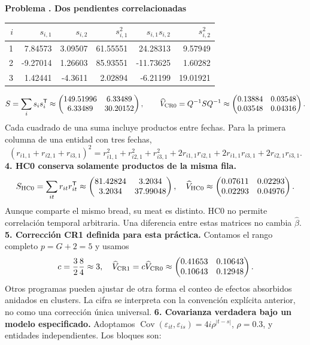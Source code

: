 \documentclass[11pt,a4paper]{article}
\newcommand{\T}{^{\mathsf T}}
\DeclareMathOperator{\Cov}{Cov}
\theoremstyle{definition}
\newcounter{problema}
\newenvironment{resuelto}[1]{\refstepcounter{problema}\par\medskip\Needspace{6\baselineskip}\textbf{Problema \theproblema. #1}\par}{\par\medskip}
\newcommand{\eps}{\varepsilon}
\begin{document}
\begin{resuelto}{Dos pendientes correlacionadas}
\begin{center}\small
\begin{tabular}{rrrrrr}
\toprule
$i$&$s_{i,1}$&$s_{i,2}$&$s_{i,1}^2$&$s_{i,1}s_{i,2}$&$s_{i,2}^2$\\
\midrule
1&7.84573&3.09507&61.55551&24.28313&9.57949\\
2&-9.27014&1.26603&85.93551&-11.73625&1.60282\\
3&1.42441&-4.3611&2.02894&-6.21199&19.01921\\
\bottomrule
\end{tabular}
\end{center}
\[
S=\sum_i s_is_i\T\approx\begin{pmatrix}
149.51996&6.33489\\6.33489&30.20152
\end{pmatrix},\qquad \widehat V_{\rm CR0}=Q^{-1}SQ^{-1}\approx\begin{pmatrix}
0.13884&0.03548\\0.03548&0.04316
\end{pmatrix}.
\]
Cada cuadrado de una suma incluye productos entre fechas. Para la primera columna de una entidad con tres fechas,
\[
(r_{i1,1}+r_{i2,1}+r_{i3,1})^2
=r_{i1,1}^2+r_{i2,1}^2+r_{i3,1}^2
+2r_{i1,1}r_{i2,1}+2r_{i1,1}r_{i3,1}+2r_{i2,1}r_{i3,1}.
\]
\textbf{4. HC0 conserva solamente productos de la misma fila.}
\[
S_{\rm HC0}=\sum_{it}r_{it}r_{it}\T\approx\begin{pmatrix}
81.42824&3.2034\\3.2034&37.99048
\end{pmatrix},\quad
\widehat V_{\rm HC0}\approx\begin{pmatrix}
0.07611&0.02293\\0.02293&0.04976
\end{pmatrix}.
\]
Aunque comparte el mismo bread, su meat es distinto. HC0 no permite correlación temporal arbitraria. Una diferencia entre estas matrices no cambia $\widehat\beta$.
\textbf{5. Corrección CR1 definida para esta práctica.} Contamos el rango completo $p=G+2=5$ y usamos
\[
c=\frac{3}{2}\frac{8}{4}\approx3,\quad \widehat V_{\rm CR1}=c\widehat V_{\rm CR0}\approx\begin{pmatrix}
0.41653&0.10643\\0.10643&0.12948
\end{pmatrix}.
\]
Otros programas pueden ajustar de otra forma el conteo de efectos absorbidos anidados en clusters. La cifra se interpreta con la convención explícita anterior, no como una corrección única universal.
\textbf{6. Covarianza verdadera bajo un modelo especificado.} Adoptamos $\Cov(\eps_{it},\eps_{is})=4i\rho^{|t-s|}$, $\rho=0.3$, y entidades independientes. Los bloques son:

\end{resuelto}
\end{document}

